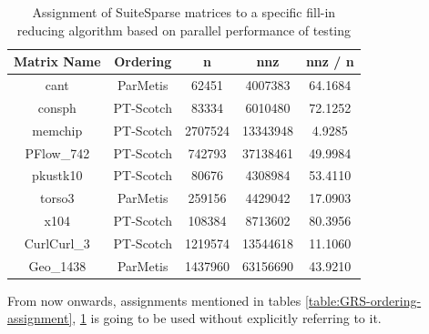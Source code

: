 \begin{table}[htpb]
\centering
\begin{tabular}{|c|c|c|c|c|}
\hline
Matrix Name & Ordering  & n       & nnz      & nnz / n \\ \hline
cant        & ParMetis  & 62451   & 4007383  & 64.1684 \\ \hline
consph      & PT-Scotch & 83334   & 6010480  & 72.1252 \\ \hline
memchip     & PT-Scotch & 2707524 & 13343948 & 4.9285  \\ \hline
PFlow\_742  & PT-Scotch & 742793  & 37138461 & 49.9984 \\ \hline
pkustk10    & PT-Scotch & 80676   & 4308984  & 53.4110 \\ \hline
torso3      & ParMetis  & 259156  & 4429042  & 17.0903 \\ \hline
x104        & PT-Scotch & 108384  & 8713602  & 80.3956 \\ \hline
CurlCurl\_3 & PT-Scotch & 1219574 & 13544618 & 11.1060 \\ \hline
Geo\_1438   & ParMetis  & 1437960 & 63156690 & 43.9210 \\ \hline
\end{tabular}
\caption{Assignment of SuiteSparse matrices to a specific fill-in reducing algorithm based on parallel performance of testing}
\label{table:SuiteSparse-ordering-assignment}
\end{table}


From now onwards, assignments mentioned in tables \ref{table:GRS-ordering-assignment}, \ref{table:SuiteSparse-ordering-assignment} is going to be used without explicitly referring to it.\\
